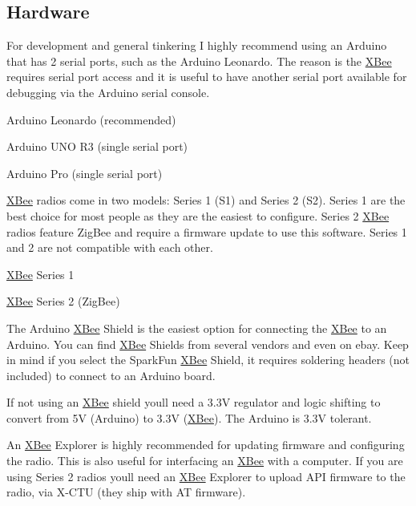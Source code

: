 \subsection*{Hardware}

For development and general tinkering I highly recommend using an Arduino that has 2 serial ports, such as the Arduino Leonardo. The reason is the \hyperlink{class_x_bee}{X\+Bee} requires serial port access and it is useful to have another serial port available for debugging via the Arduino serial console.


\begin{DoxyItemize}
\item Arduino Leonardo (recommended)
\item Arduino U\+NO R3 (single serial port)
\item Arduino Pro (single serial port)
\end{DoxyItemize}

\hyperlink{class_x_bee}{X\+Bee} radios come in two models\+: Series 1 (S1) and Series 2 (S2). Series 1 are the best choice for most people as they are the easiest to configure. Series 2 \hyperlink{class_x_bee}{X\+Bee} radios feature Zig\+Bee and require a firmware update to use this software. Series 1 and 2 are not compatible with each other.


\begin{DoxyItemize}
\item \hyperlink{class_x_bee}{X\+Bee} Series 1
\item \hyperlink{class_x_bee}{X\+Bee} Series 2 (Zig\+Bee)
\end{DoxyItemize}

The Arduino \hyperlink{class_x_bee}{X\+Bee} Shield is the easiest option for connecting the \hyperlink{class_x_bee}{X\+Bee} to an Arduino. You can find \hyperlink{class_x_bee}{X\+Bee} Shields from several vendors and even on ebay. Keep in mind if you select the Spark\+Fun \hyperlink{class_x_bee}{X\+Bee} Shield, it requires soldering headers (not included) to connect to an Arduino board.

If not using an \hyperlink{class_x_bee}{X\+Bee} shield you\textquotesingle{}ll need a 3.\+3V regulator and logic shifting to convert from 5V (Arduino) to 3.\+3V (\hyperlink{class_x_bee}{X\+Bee}). The Arduino is 3.\+3V tolerant.

An \hyperlink{class_x_bee}{X\+Bee} Explorer is highly recommended for updating firmware and configuring the radio. This is also useful for interfacing an \hyperlink{class_x_bee}{X\+Bee} with a computer. If you are using Series 2 radios you\textquotesingle{}ll need an \hyperlink{class_x_bee}{X\+Bee} Explorer to upload A\+PI firmware to the radio, via X-\/\+C\+TU (they ship with AT firmware).


